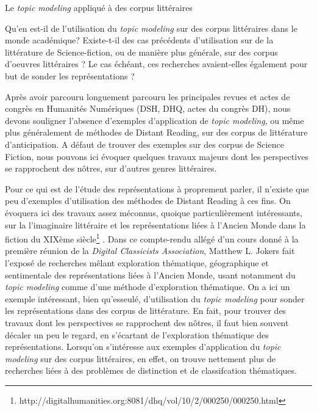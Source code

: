 \documentclass[letterpaper,portrait,12pt]{article}
\begin{document}
	Le \emph{topic modeling} appliqu\'{e} \`{a} des corpus litt\'{e}raires





\textbf{\textcolor[rgb]{0.000,0.000,0.000}{	}}\textcolor[rgb]{0.000,0.000,0.000}{Qu'en est-il de l'utilisation du }\emph{\textcolor[rgb]{0.000,0.000,0.000}{topic modeling }}\textcolor[rgb]{0.000,0.000,0.000}{sur des corpus litt\'{e}raires dans le monde acad\'{e}mique? Existe-t-il des cas pr\'{e}c\'{e}dents d'utilisation sur de la litt\'{e}rature de Science-fiction, ou de mani\`{e}re plus g\'{e}n\'{e}rale, sur des corpus d'oeuvres litt\'{e}raires ? Le cas \'{e}ch\'{e}ant, ces recherches avaient-elles \'{e}galement pour but de sonder les repr\'{e}sentations ?}








	Apr\`{e}s avoir parcouru longuement parcouru les principales revues et actes de congr\`{e}s en Humanit\'{e}s Num\'{e}riques (DSH, DHQ, actes du congr\`{e}s DH), nous devons souligner l'absence d'exemples d'application de \emph{topic modeling}, ou m\^{e}me plus g\'{e}n\'{e}ralement de m\'{e}thodes de Distant Reading, sur des corpus de litt\'{e}rature d'anticipation. A d\'{e}faut de trouver des exemples sur des corpus de Science Fiction, nous pouvons ici \'{e}voquer quelques travaux majeurs dont les perspectives se rapprochent des n\^{o}tres, sur d'autres genres litt\'{e}raires.





	Pour ce qui est de l'\'{e}tude des repr\'{e}sentations \`{a} proprement parler, il n'existe que peu d'exemples d'utilisation des m\'{e}thodes de Distant Reading \`{a} ces fins. On \'{e}voquera ici des travaux assez m\'{e}connus, quoique particuli\`{e}rement int\'{e}ressants, sur la l'imaginaire litt\'{e}raire et les repr\'{e}sentations li\'{e}es \`{a} l'Ancien Monde dans la fiction du XIX\`{e}me si\`{e}cle\footnote{	http://digitalhumanities.org:8081/dhq/vol/10/2/000250/000250.html} . Dans ce compte-rendu all\'{e}g\'{e} d'un cours donn\'{e} \`{a} la premi\`{e}re r\'{e}union de la \emph{Digital Classicists Association}, Matthew L. Jokers fait l'expos\'{e} de recherches m\^{e}lant exploration th\'{e}matique, g\'{e}ographique et sentimentale des repr\'{e}sentations li\'{e}es \`{a} l'Ancien Monde, usant notamment du \emph{topic modeling} comme d'une m\'{e}thode d'exploration th\'{e}matique. On a ici un exemple int\'{e}ressant, bien qu'esseul\'{e}, d'utilisation du \emph{topic modeling} pour sonder les repr\'{e}sentations dans des corpus de litt\'{e}rature. En fait, pour trouver des travaux dont les perspectives se rapprochent des n\^{o}tres, il faut bien souvent d\'{e}caler un peu le regard, en s'\'{e}cartant de l'exploration th\'{e}matique des repr\'{e}sentations. Lorsqu'on s'int\'{e}resse aux exemples d'application du \emph{topic modeling} sur des corpus litt\'{e}raires, en effet, on trouve nettement plus de recherches li\'{e}es \`{a} des probl\`{e}mes de distinction et de classifcation th\'{e}matiques.
\end{document}
